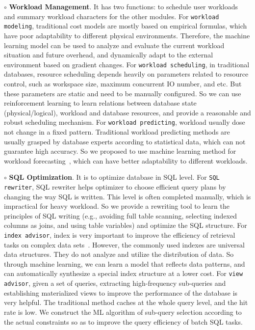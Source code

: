 $\circ$ \textbf{Workload Management}. It has two functions: to schedule user workloads and summary workload characters for the other modules. 
For \texttt{workload modeling}, traditional cost models are mostly based on empirical formulas, which have poor adaptability to different physical environments. Therefore, the machine learning model can be used to analyze and evaluate the current workload situation and future overhead, and dynamically adapt to the external environment based on gradient changes.
For \texttt{workload scheduling}, in traditional databases, resource scheduling depends heavily on parameters related to resource control, such as workspace size, maximum concurrent IO number, and etc. But these parameters are static and need to be manually configured. So we can use reinforcement learning to learn relations between database state (physical/logical), workload and database resources, and provide a reasonable and robust scheduling mechanism.
For \texttt{workload predicting}, workload usually dose not change in a fixed pattern. Traditional workload predicting methods are usually grasped by database experts according to statistical data, which can not guarantee high accuracy. So we proposed to use machine learning method for workload forecasting~\cite{DBLP:conf/sigmod/MaAHMPG18}, which can have better adaptability to different workloads. 

$\circ$ \textbf{SQL Optimization}. It is to optimize database in SQL level. 
For \texttt{SQL rewriter}, SQL rewriter helps optimizer to choose efficient query plans by changing the way SQL is written. This level is often completed manually, which is impractical for heavy workload. So we provide a rewriting tool to learn the principles of SQL writing (e.g., avoiding full table scanning, selecting indexed columns as joins, and using table variables) and optimize the SQL structure. 
For \texttt{index advisor}, index is very important to improve the efficiency of retrieval tasks on complex data sets~\cite{DBLP:journals/kais/GaniSSH16}. However, the commonly used indexes are universal data structures. They do not analyze and utilize the distribution of data. So through machine learning, we can learn a model that reflects data patterns, and can automatically synthesize a special index structure at a lower cost.
For \texttt{view advisor}, given a set of queries, extracting high-frequency sub-queries and establishing materialized views to improve the performance of the database is very helpful. 
The traditional method caches at the whole query level, and the hit rate is low.
We construct the ML algorithm of sub-query selection according to the actual constraints so as to improve the query efficiency of batch SQL tasks.

